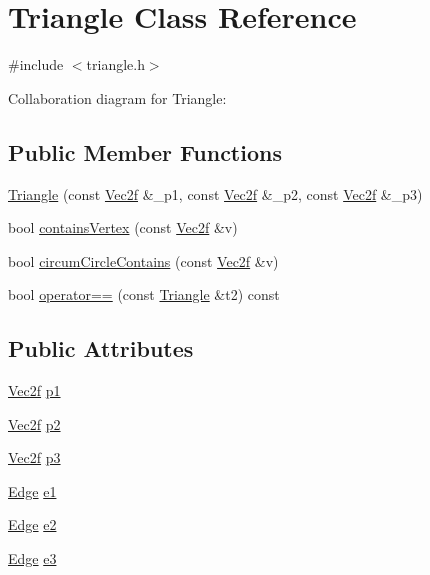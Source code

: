\hypertarget{class_triangle}{}\section{Triangle Class Reference}
\label{class_triangle}


{\ttfamily \#include $<$triangle.h$>$}



Collaboration diagram for Triangle:
\subsection*{Public Member Functions}
\begin{DoxyCompactItemize}
\item 
\hyperlink{class_triangle_ac91f2225feea061bdc8b90b5ad05ab42}{Triangle} (const \hyperlink{class_vec2f}{Vec2f} \&\_p1, const \hyperlink{class_vec2f}{Vec2f} \&\_p2, const \hyperlink{class_vec2f}{Vec2f} \&\_p3)
\item 
bool \hyperlink{class_triangle_a8b279a0dff36453b04b359dc1c3dfb50}{containsVertex} (const \hyperlink{class_vec2f}{Vec2f} \&v)
\item 
bool \hyperlink{class_triangle_a7a46dcbaa3532abb09c561ae79a3cc77}{circumCircleContains} (const \hyperlink{class_vec2f}{Vec2f} \&v)
\item 
bool \hyperlink{class_triangle_a12315ef4973d7f56ca51760330391e05}{operator==} (const \hyperlink{class_triangle}{Triangle} \&t2) const 
\end{DoxyCompactItemize}
\subsection*{Public Attributes}
\begin{DoxyCompactItemize}
\item 
\hyperlink{class_vec2f}{Vec2f} \hyperlink{class_triangle_af2ff757f1bff3177e1a0e8c19664edbc}{p1}
\item 
\hyperlink{class_vec2f}{Vec2f} \hyperlink{class_triangle_a6a7d000238fb26c47181de1e7a502037}{p2}
\item 
\hyperlink{class_vec2f}{Vec2f} \hyperlink{class_triangle_a43b6750934c84aff2f34b38d2f26d012}{p3}
\item 
\hyperlink{class_edge}{Edge} \hyperlink{class_triangle_ab91aa48d8a4c25deecd1a35433a38260}{e1}
\item 
\hyperlink{class_edge}{Edge} \hyperlink{class_triangle_a5ad4339f6fb03adb4f6ee840ace34d82}{e2}
\item 
\hyperlink{class_edge}{Edge} \hyperlink{class_triangle_aa55fc8f8662cba36b227858760bb173c}{e3}
\end{DoxyCompactItemize}
